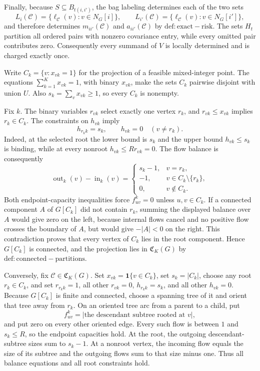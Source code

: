 Finally, because \(S\subseteq B_{t(i,i')}\), the bag labeling determines each of the two sets
\[
  L_i(\mathcal C)=\{\ell_{\mathcal C}(v):v\in N_G[i]\},\qquad
  L_{i'}(\mathcal C)=\{\ell_{\mathcal C}(v):v\in N_G[i']\},
\]
and therefore determines \(m_{ii'}(\mathcal C)\) and \(a_{ii'}(\mathcal C)\) by \(\mathrm{def:exact-risk}\).  The sets \(H_t\) partition all ordered pairs with nonzero covariance entry, while every omitted pair contributes zero.  Consequently every summand of \(V\) is locally determined and is charged exactly once.

Write \(C_k=\{v:x_{vk}=1\}\) for the projection of a feasible mixed-integer point.  The equations \(\sum_{k=1}^Kx_{vk}=1\), with binary \(x_{vk}\), make the sets \(C_k\) pairwise disjoint with union \(U\).  Also \(s_k=\sum_vx_{vk}\ge1\), so every \(C_k\) is nonempty.

Fix \(k\).  The binary variables \(r_{vk}\) select exactly one vertex \(r_k\), and \(r_{vk}\le x_{vk}\) implies \(r_k\in C_k\).  The constraints on \(h_{vk}\) imply
\[
 h_{r_k k}=s_k,\qquad h_{vk}=0\quad(v\ne r_k).
\]
Indeed, at the selected root the lower bound is \(s_k\) and the upper bound \(h_{vk}\le s_k\) is binding, while at every nonroot \(h_{vk}\le Rr_{vk}=0\).  The flow balance is consequently
\[
 \operatorname{out}_k(v)-\operatorname{in}_k(v)
 =\begin{cases}
 s_k-1,&v=r_k,\\
 -1,&v\in C_k\setminus\{r_k\},\\
 0,&v\notin C_k.
 \end{cases}
\]
Both endpoint-capacity inequalities force \(f^k_{uv}=0\) unless \(u,v\in C_k\).  If a connected component \(A\) of \(G[C_k]\) did not contain \(r_k\), summing the displayed balance over \(A\) would give zero on the left, because internal flows cancel and no positive flow crosses the boundary of \(A\), but would give \(-|A|<0\) on the right.  This contradiction proves that every vertex of \(C_k\) lies in the root component.  Hence \(G[C_k]\) is connected, and the projection lies in \(\mathfrak C_K(G)\) by \(\mathrm{def:connected-partitions}\).

Conversely, fix \(\mathcal C\in\mathfrak C_K(G)\).  Set \(x_{vk}=\mathbf 1\{v\in C_k\}\), set \(s_k=|C_k|\), choose any root \(r_k\in C_k\), and set \(r_{r_k k}=1\), all other \(r_{vk}=0\), \(h_{r_k k}=s_k\), and all other \(h_{vk}=0\).  Because \(G[C_k]\) is finite and connected, choose a spanning tree of it and orient that tree away from \(r_k\).  On an oriented tree arc from a parent to a child, put
\[
 f^k_{uv}=\bigl|\text{the descendant subtree rooted at }v\bigr|,
\]
and put zero on every other oriented edge.  Every such flow is between \(1\) and \(s_k\le R\), so the endpoint capacities hold.  At the root, the outgoing descendant-subtree sizes sum to \(s_k-1\).  At a nonroot vertex, the incoming flow equals the size of its subtree and the outgoing flows sum to that size minus one.  Thus all balance equations and all root constraints hold.


